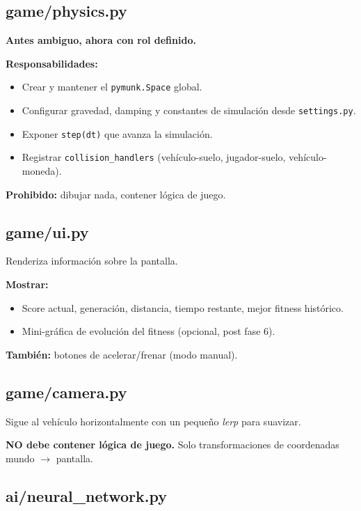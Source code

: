\documentclass[11pt,a4paper]{article}
\begin{document}
\subsection{game/physics.py}

\textbf{Antes ambiguo, ahora con rol definido.}

\textbf{Responsabilidades:}
\begin{itemize}
    \item Crear y mantener el \texttt{pymunk.Space} global.
    \item Configurar gravedad, damping y constantes de simulación desde \texttt{settings.py}.
    \item Exponer \texttt{step(dt)} que avanza la simulación.
    \item Registrar \texttt{collision\_handlers} (vehículo-suelo, jugador-suelo, vehículo-moneda).
\end{itemize}

\textbf{Prohibido:} dibujar nada, contener lógica de juego.

\subsection{game/ui.py}

Renderiza información sobre la pantalla.

\textbf{Mostrar:}
\begin{itemize}
    \item Score actual, generación, distancia, tiempo restante, mejor fitness histórico.
    \item Mini-gráfica de evolución del fitness (opcional, post fase 6).
\end{itemize}

\textbf{También:} botones de acelerar/frenar (modo manual).

\subsection{game/camera.py}

Sigue al vehículo horizontalmente con un pequeño \textit{lerp} para suavizar.

\textbf{NO debe contener lógica de juego.} Solo transformaciones de coordenadas mundo $\rightarrow$ pantalla.

\subsection{ai/neural\_network.py}
\end{document}
